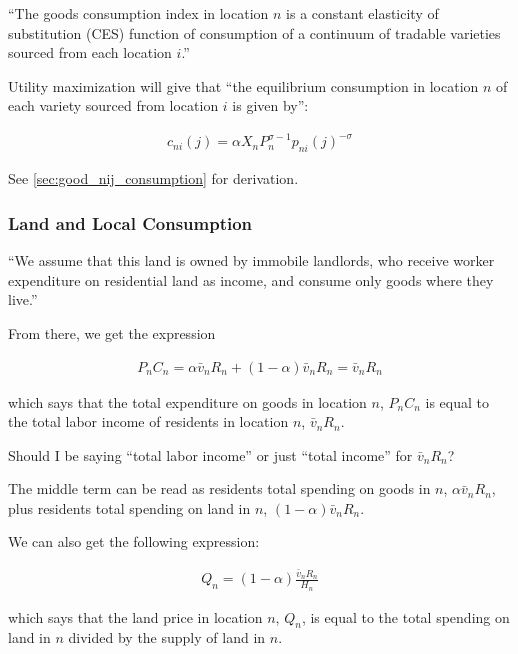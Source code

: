 \documentclass[10pt]{article}
\begin{document}
``The goods consumption index in location $n$ is a constant elasticity of 
substitution (CES) function of consumption of a continuum of tradable 
varieties sourced from each location $i$.''

Utility maximization 
will give that ``the equilibrium consumption 
in location $n$ of each variety sourced from 
location $i$ 
is given by'':

\begin{align}
    c_{n i}(j)=\alpha X_n P_n^{\sigma-1} p_{n i}(j)^{-\sigma} \label{eq:good_nij_consumption}
\end{align}

See \autoref{sec:good_nij_consumption} for derivation.

\subsubsection{Land and Local Consumption}

``We assume that this land is owned by immobile landlords,
who receive worker expenditure on residential land as income, and consume only
goods where they live.''

From there, we get the expression

\begin{align}
    P_n C_n=\alpha \bar{v}_n R_n+(1-\alpha) \bar{v}_n R_n=\bar{v}_n R_n
\end{align}

which says that the 
total expenditure on goods in location $n$, $P_n C_n$
is equal to the total labor income of 
residents in location $n$, $\bar{v}_n R_n$.

\begin{questions}
    Should I be saying ``total labor income'' or just ``total income''
    for $\bar{v}_n R_n$?
\end{questions}

The middle term can be read as 
residents total spending on goods in $n$,
$\alpha \bar{v}_n R_n$, plus 
residents total spending on land in $n$,
$(1-\alpha) \bar{v}_n R_n$.

We can also get the following expression:

\begin{align}
    Q_n=(1-\alpha) \frac{\bar{v}_n R_n}{H_n}
\end{align}

which says that 
the land price in location $n$, $Q_n$,
is equal to the total spending on land in $n$ 
divided by the supply of land in $n$.
\end{document}
